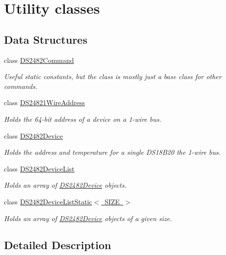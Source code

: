 \hypertarget{group___utility}{}\section{Utility classes}
\label{group___utility}
\subsection*{Data Structures}
\begin{DoxyCompactItemize}
\item 
class \mbox{\hyperlink{class_d_s2482_command}{D\+S2482\+Command}}
\begin{DoxyCompactList}\small\item\em Useful static constants, but the class is mostly just a base class for other commands. \end{DoxyCompactList}\item 
class \mbox{\hyperlink{class_d_s24821_wire_address}{D\+S24821\+Wire\+Address}}
\begin{DoxyCompactList}\small\item\em Holds the 64-\/bit address of a device on a 1-\/wire bus. \end{DoxyCompactList}\item 
class \mbox{\hyperlink{class_d_s2482_device}{D\+S2482\+Device}}
\begin{DoxyCompactList}\small\item\em Holds the address and temperature for a single D\+S18\+B20 the 1-\/wire bus. \end{DoxyCompactList}\item 
class \mbox{\hyperlink{class_d_s2482_device_list}{D\+S2482\+Device\+List}}
\begin{DoxyCompactList}\small\item\em Holds an array of \mbox{\hyperlink{class_d_s2482_device}{D\+S2482\+Device}} objects. \end{DoxyCompactList}\item 
class \mbox{\hyperlink{class_d_s2482_device_list_static}{D\+S2482\+Device\+List\+Static$<$ S\+I\+Z\+E $>$}}
\begin{DoxyCompactList}\small\item\em Holds an array of \mbox{\hyperlink{class_d_s2482_device}{D\+S2482\+Device}} objects of a given size. \end{DoxyCompactList}\end{DoxyCompactItemize}


\subsection{Detailed Description}
